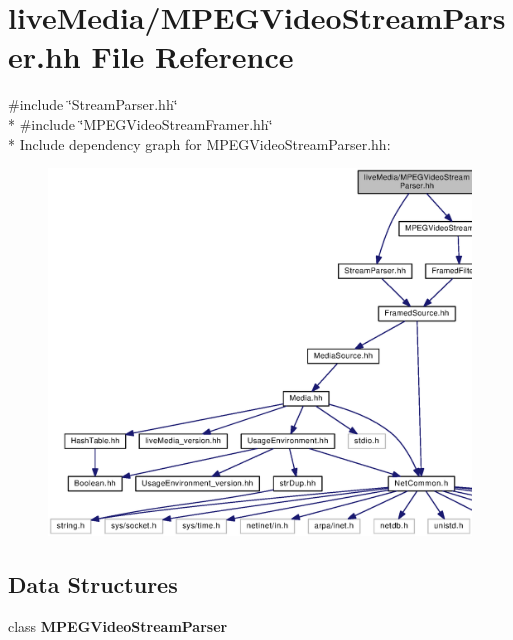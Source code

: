 \section{live\+Media/\+M\+P\+E\+G\+Video\+Stream\+Parser.hh File Reference}
\label{MPEGVideoStreamParser_8hh}
{\ttfamily \#include \char`\"{}Stream\+Parser.\+hh\char`\"{}}\\*
{\ttfamily \#include \char`\"{}M\+P\+E\+G\+Video\+Stream\+Framer.\+hh\char`\"{}}\\*
Include dependency graph for M\+P\+E\+G\+Video\+Stream\+Parser.\+hh\+:
\nopagebreak
\begin{figure}[H]
\begin{center}
\leavevmode
\includegraphics[width=350pt]{MPEGVideoStreamParser_8hh__incl}
\end{center}
\end{figure}
\subsection*{Data Structures}
\begin{DoxyCompactItemize}
\item 
class {\bf M\+P\+E\+G\+Video\+Stream\+Parser}
\end{DoxyCompactItemize}
